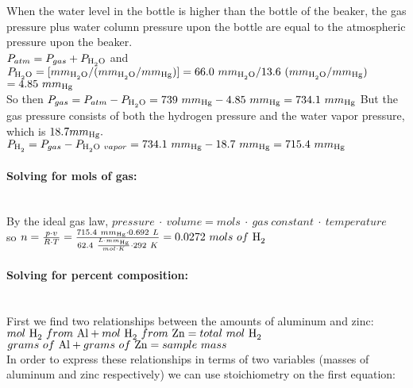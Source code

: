 \documentclass[11pt,letterpaper]{report}
\begin{document}
\noindent When the water level in the bottle is higher than the bottle of the beaker, the gas pressure plus water column pressure upon the bottle are equal to the atmospheric pressure upon the beaker. \\[0.1cm]

 \noindent $P_{atm} = P_{gas} + P_{\ce{H2O}}$ and $P_{\ce{H2O}} = [mm_{\ce{H2O}} / (mm_{\ce{H2O}} / mm_{\ce{Hg}})] = 66.0\  mm_{\ce{H2O}} / 13.6\  (mm_{\ce{H2O}} / mm_{\ce{Hg}})$ \\ [0.1cm]
 $= 4.85\  mm_{\ce{Hg}}$\\[0.1cm]

\noindent So then $P_{gas} = P_{atm} - P_{\ce{H2O}} = 739\  mm_{\ce{Hg}} - 4.85\ mm_{\ce{Hg}} = 734.1\ mm_{\ce{Hg}} $ But the gas pressure consists of both the hydrogen pressure and the water vapor pressure, which is $18.7 mm_{\ce{Hg}}.$ $P_{\ce{H2}} = P_{gas} - P_{\ce{H2O}\ vapor} = 734.1\ mm_{\ce{Hg}} - 18.7\ mm_{\ce{Hg}} = 715.4\ mm_{\ce{Hg}}$ \\

\paragraph{Solving for mols of  gas:}\mbox{} \\[0.1cm]

\noindent By the ideal gas law, $pressure\ \cdot\ volume = mols\ \cdot\ gas\ constant\ \cdot\ temperature$ \\[0.1cm]
 so $n = \frac{p \cdot v}{R \cdot T} =
\frac{715.4\ mm_{\ce{Hg}} \cdot 0.692\ L}{62.4\ \frac{L \cdot  mm_{\ce{Hg}}}{mol \cdot K} \cdot 292\ K} = 0.0272\ mols\ of\ \ce{H2}$

\vfill

\paragraph{Solving for percent composition:}\mbox{} \\[0.1cm]

\noindent First we find two relationships between the amounts of aluminum and zinc:\\[0.15cm]

\noindent $mol\ \ce{H2}\ from\ \ce{Al} + mol\ \ce{H2}\ from\ \ce{Zn} = total\ mol\ \ce{H2}$ \\
$grams\ of\ \ce{Al} + grams\ of\ \ce{Zn} = sample\ mass$\\[0.3cm]

\noindent In order to express these relationships in terms of two variables (masses of aluminum and zinc respectively) we can use stoichiometry on the first equation: \\[0.1cm]
\end{document}

